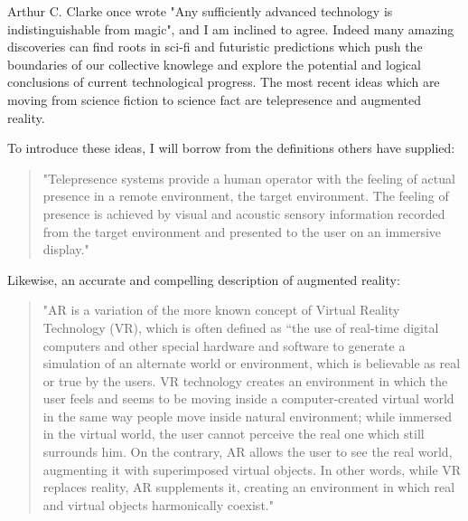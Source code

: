 \documentclass[a4paper,12pt]{report}
\begin{document}
Arthur C. Clarke once wrote "Any sufficiently advanced technology is indistinguishable from magic", and I am inclined to agree. Indeed many amazing discoveries can find roots in sci-fi and futuristic predictions which push the boundaries of our collective knowlege and explore the potential and logical conclusions of current technological progress. The most recent ideas which are moving from science fiction to science fact are telepresence and augmented reality. 
	\begin{flushright}
		\cite{0001}
	\end{flushright}

To introduce these ideas, I will borrow from the definitions others have supplied:
\begin{quotation}
"Telepresence systems provide a human operator with the feeling of actual presence in a remote environment, the target environment. The feeling of presence is achieved by visual and acoustic sensory information recorded from the target environment and presented to the user on an immersive display."
	\begin{flushright}
		\cite{6094998}
	\end{flushright}
\end{quotation}

Likewise, an accurate and compelling description of augmented reality:

\begin{quotation}
"AR is a variation of the more known concept of Virtual Reality Technology (VR), which is often defined as “the use of real-time digital computers and other special hardware and software to generate a simulation of an alternate world or environment, which is believable as real or true by the users. VR technology creates an environment in which the user feels and seems to be moving inside a computer-created virtual world in the same way people move inside natural environment; while immersed in the virtual world, the user cannot perceive the real one which still surrounds him. On the contrary, AR allows the user to see the real world, augmenting it with superimposed virtual objects. In other words, while VR replaces reality, AR supplements it, creating an environment in which real and virtual objects harmonically coexist."
	\begin{flushright}
		\cite{5970856}
	\end{flushright}
\end{quotation}
\end{document}
